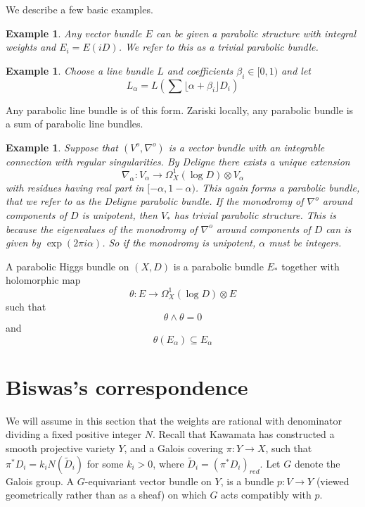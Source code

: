 \documentclass{amsart}
\newtheorem{ex}[thm]{Example}
\begin{document}
We describe a few  basic examples. 

\begin{ex}\label{ex:trivial}
 Any vector bundle $E$ can be given a parabolic structure with integral weights and  $E_i= E(iD)$. We refer to this
 as a trivial parabolic bundle.
\end{ex}


\begin{ex}\label{ex:paraline}
 Choose a line bundle $L$ and
coefficients $\beta_i \in [0,1)$ and let
\begin{equation}
  \label{eq:L}
L_\alpha= L(\sum \lfloor \alpha+\beta_i\rfloor D_i)  
\end{equation}
\end{ex}

Any parabolic line bundle is of this form. Zariski locally, any
parabolic bundle is a sum of parabolic line bundles.

\begin{ex}\label{ex:paraDel}
 Suppose that $(V^o,\nabla^o)$ is  a  vector bundle with an integrable connection with regular singularities. By Deligne \cite{deligne}
there exists a unique extension
$$\nabla_\alpha:V_\alpha\to \Omega_{X}^1(\log D)\otimes V_\alpha$$
with residues having real part in $[ -\alpha,1-\alpha)$. This again forms a parabolic bundle, that we refer to as the Deligne parabolic bundle.
If the monodromy of $\nabla^o$  around components of $D$ is unipotent, then $V_*$ has trivial 
parabolic structure. This is because the eigenvalues of the monodromy of $\nabla^o$ around 
components of $D$ can is given by $\exp(2\pi i\alpha)$. 
So if the monodromy is unipotent, $\alpha$ must be integers. 
\end{ex}

A parabolic Higgs bundle on $(X,D)$ is a parabolic bundle $E_*$ together
with holomorphic map
$$\theta:E\to \Omega_X^1(\log D)\otimes E$$
such that
$$\theta\wedge \theta=0$$
and
$$\theta(E_\alpha)\subseteq E_\alpha$$

\section{Biswas's correspondence}
We will assume in this section  that the weights are rational with denominator dividing a fixed positive integer $N$.
 Recall that Kawamata \cite[thm17]{kawamata} has constructed a smooth projective variety $Y$, and a Galois covering
$\pi:Y\to X$, such that $\pi^*D_i = k_iN (
\tilde D_i)$ for some $k_i>0$, where $\tilde D_i=(\pi^*D_i)_{red}$.
Let $G$ denote the Galois group. A $G$-equivariant vector bundle on
$Y$, is a bundle $p:V\to Y$ (viewed geometrically rather than as a
sheaf) on which $G$ acts compatibly with $p$.  
\end{document}
